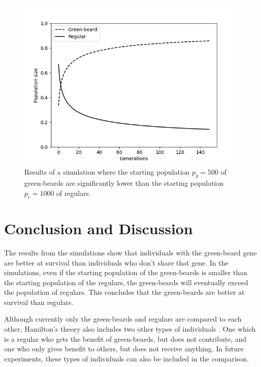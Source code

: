 \documentclass[conference]{IEEEtran}
\begin{document}
	\begin{figure}[htbp]
		\centerline{\includegraphics[scale=0.5]{figures/1000-500.png}}
		\caption{Results of a simulation where the starting population $p_g = 500$ of green-beards are significantly lower than the starting population $p_r = 1000$ of regulars.}
		\label{fig:1000-500}
	\end{figure}
	
	\section{Conclusion and Discussion}
	The results from the simulations show that individuals with the green-beard gene are better at survival than individuals who don't share that gene. In the simulations, even if the starting population of the green-beards is smaller than the starting population of the regulars, the green-beards will eventually exceed the population of regulars. This concludes that the green-beards are better at survival than regulars.
	
	Although currently only the green-beards and regulars are compared to each other, Hamilton's theory also includes two other types of individuals \cite{hamilton1964genetical}. One which is a regular who gets the benefit of green-beards, but does not contribute, and one who only gives benefit to others, but does not receive anything. In future experiments, these types of individuals can also be included in the comparison.
	


	
\end{document}
